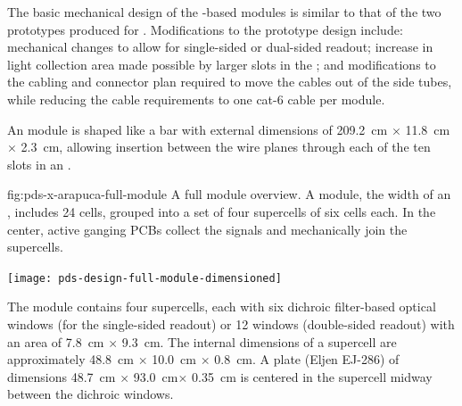 The basic mechanical design of the -based  modules %
is similar to that of the two prototypes produced for . Modifications to the prototype design include:  mechanical changes to allow for single-sided or dual-sided readout; increase in light collection area made possible by larger slots in the ; and modifications to the cabling and connector plan required to move the  cables out of the  side tubes, while reducing the cable requirements to one cat-6 cable per  module.


An  module is shaped like a bar with external dimensions of \SI{209.2}{cm} $\times$ \SI{11.8}{cm} $\times$ \SI{2.3}{cm},  allowing insertion between the wire planes through each of the ten slots in an . 


\begin{dunefigure}
{fig:pds-x-arapuca-full-module}
{A full  module overview. A module, the width of an , includes 24
  cells, grouped into a set of four supercells of six cells each. In the center, active ganging PCBs collect the signals and mechanically join the supercells.}
 
   \texttt{[image: pds-design-full-module-dimensioned]}
\end{dunefigure}

The module contains four  supercells, each with six dichroic filter-based optical windows (for the single-sided readout) or 12 windows (double-sided readout) with an area of \SI{7.8}{cm} $\times$ \SI{9.3}{cm}.  The internal dimensions of  a supercell are approximately \SI{48.8}{cm} $\times$ \SI{10.0}{cm} $\times$ \SI{0.8}{cm}. A  plate (Eljen EJ-286) of dimensions \SI{48.7}{cm} $\times$ \SI{93.0}{cm}$\times$ \SI{0.35}{cm} is centered in the supercell midway between the dichroic windows.  
 


